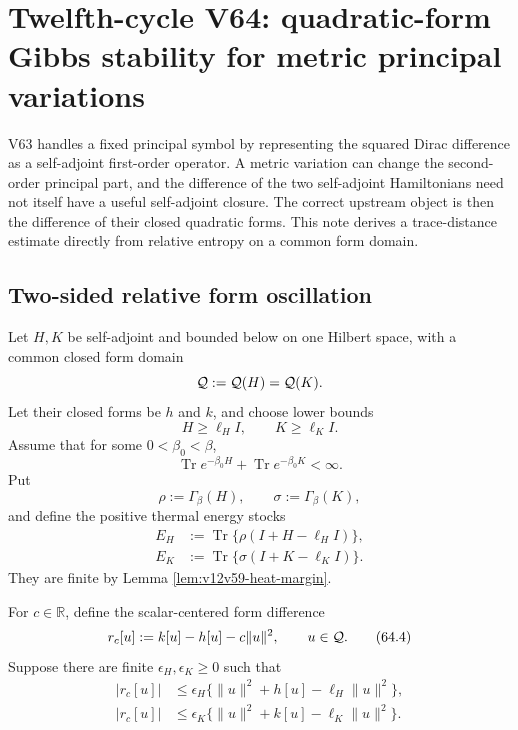 \documentclass[11pt]{article}
\theoremstyle{remark}
\begin{document}

\section{Twelfth-cycle V64: quadratic-form Gibbs stability for
metric principal variations}
\label{sec:v12v64}

V63 handles a fixed principal symbol by representing the squared
Dirac difference as a self-adjoint first-order operator.  A metric
variation can change the second-order principal part, and the
difference of the two self-adjoint Hamiltonians need not itself have
a useful self-adjoint closure.  The correct upstream object is then
the difference of their closed quadratic forms.  This note derives a
trace-distance estimate directly from relative entropy on a common
form domain.

\subsection{Two-sided relative form oscillation}

Let \(H,K\) be self-adjoint and bounded below on one Hilbert space,
with a common closed form domain
\[
                         {\cal Q}:={\cal Q}(H)={\cal Q}(K).
\]
Let their closed forms be \(h\) and \(k\), and choose lower bounds
\[
                         H\geq\ell_HI,\qquad K\geq\ell_KI.
\]
Assume that for some \(0<\beta_0<\beta\),
\begin{equation}
 \operatorname{Tr}e^{-\beta_0H}
 +
 \operatorname{Tr}e^{-\beta_0K}<\infty.           \tag{64.1}
\end{equation}
Put
\[
 \rho:=\Gamma_\beta(H),\qquad
 \sigma:=\Gamma_\beta(K),
\]
and define the positive thermal energy stocks
\begin{align}
 E_H&:=
 \operatorname{Tr}\{\rho(I+H-\ell_HI)\},           \tag{64.2}\\
 E_K&:=
 \operatorname{Tr}\{\sigma(I+K-\ell_KI)\}.         \tag{64.3}
\end{align}
They are finite by Lemma \ref{lem:v12v59-heat-margin}.

For \(c\in\mathbb R\), define the scalar-centered form difference
\begin{equation}
 r_c[u]
 :=
 k[u]-h[u]-c\|u\|^2,\qquad u\in{\cal Q}.           \tag{64.4}
\end{equation}
Suppose there are finite \(\epsilon_H,\epsilon_K\geq0\) such that
\begin{align}
 |r_c[u]|
 &\leq
 \epsilon_H\{
 \|u\|^2+h[u]-\ell_H\|u\|^2\},                    \tag{64.5}\\
 |r_c[u]|
 &\leq
 \epsilon_K\{
 \|u\|^2+k[u]-\ell_K\|u\|^2\}.                    \tag{64.6}
\end{align}
\end{document}
